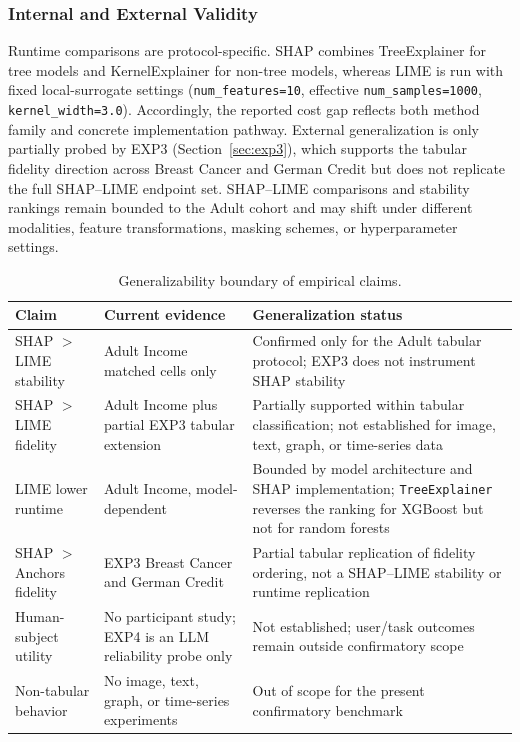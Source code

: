 \documentclass[fleqn,10pt,lineno]{wlpeerj}
\begin{document}
\subsubsection{Internal and External Validity}

Runtime comparisons are protocol-specific. SHAP combines TreeExplainer
for tree models and KernelExplainer for non-tree models, whereas LIME is
run with fixed local-surrogate settings (\texttt{num\_features=10},
effective \texttt{num\_samples=1000}, \texttt{kernel\_width=3.0}).
Accordingly, the reported cost gap reflects both method family and
concrete implementation pathway. External generalization is only partially
probed by EXP3 (Section~\ref{sec:exp3}), which supports the tabular
fidelity direction across Breast Cancer and German Credit but does not
replicate the full SHAP--LIME endpoint set. SHAP--LIME comparisons and
stability rankings remain bounded to the Adult cohort and may shift under
different modalities, feature transformations, masking schemes, or
hyperparameter settings.

\begin{table}[t]
\centering
\caption{Generalizability boundary of empirical claims.}
\label{tab:generalizability_boundary}
\begin{tabularx}{\linewidth}{l X X}
\toprule
\textbf{Claim} & \textbf{Current evidence} & \textbf{Generalization status} \\
\midrule
SHAP $>$ LIME stability & Adult Income matched cells only & Confirmed only for the Adult tabular protocol; EXP3 does not instrument SHAP stability \\
SHAP $>$ LIME fidelity & Adult Income plus partial EXP3 tabular extension & Partially supported within tabular classification; not established for image, text, graph, or time-series data \\
LIME lower runtime & Adult Income, model-dependent & Bounded by model architecture and SHAP implementation; \texttt{TreeExplainer} reverses the ranking for XGBoost but not for random forests \\
SHAP $>$ Anchors fidelity & EXP3 Breast Cancer and German Credit & Partial tabular replication of fidelity ordering, not a SHAP--LIME stability or runtime replication \\
Human-subject utility & No participant study; EXP4 is an LLM reliability probe only & Not established; user/task outcomes remain outside confirmatory scope \\
Non-tabular behavior & No image, text, graph, or time-series experiments & Out of scope for the present confirmatory benchmark \\
\bottomrule
\end{tabularx}
\end{table}
\end{document}
